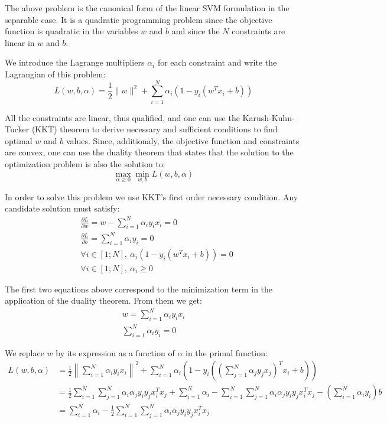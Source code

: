 \documentclass{article}
\begin{document}
The above problem is the canonical form of the linear SVM formulation in the separable case. It is a quadratic programming problem since the objective function is quadratic in the variables $w$ and $b$ and since the $N$ constraints are linear in $w$ and $b$.

We introduce the Lagrange multipliers $\alpha_i$ for each constraint and write the Lagrangian of this problem:
\begin{equation*}
L(w,b,\alpha) = \frac{1}{2} \|w\|^2 + \sum_{i=1}^N \alpha_i\left(1-y_i\left( w^Tx_i + b \right)\right)
\end{equation*}

All the constraints are linear, thus qualified, and one can use the Karush-Kuhn-Tucker (KKT) theorem to derive necessary and sufficient conditions to find optimal $w$ and $b$ values. Since, additionaly, the objective function and constraints are convex, one can use the duality theorem that states that the solution to the optimization problem is also the solution to:
\begin{equation*}
\max_{\alpha \geq 0} \min_{w,b} L(w,b,\alpha)
\end{equation*}

In order to solve this problem we use KKT's first order necessary condition. Any candidate solution must satisfy:
\begin{align*}
&\frac{\partial L}{\partial w} = w - \sum_{i=1}^N \alpha_i y_i x_i = 0\\
&\frac{\partial L}{\partial b} = \sum_{i=1}^N \alpha_i y_i = 0\\
&\forall i\in [1;N], \ \alpha_i\left(1-y_i\left( w^Tx_i + b \right)\right) = 0\\
&\forall i\in [1;N], \ \alpha_i \geq 0
\end{align*}

The first two equations above correspond to the minimization term in the application of the duality theorem. From them we get:
\begin{gather*}
w= \sum_{i=1}^N \alpha_i y_i x_i\\
\sum_{i=1}^N \alpha_i y_i = 0
\end{gather*}

We replace $w$ by its expression as a function of $\alpha$ in the primal function:
\begin{align*}
L(w,b,\alpha) &= \frac{1}{2} \left\|\sum_{i=1}^N \alpha_i y_i x_i\right\|^2 + \sum_{i=1}^N \alpha_i\left(1-y_i\left( \left(\sum_{j=1}^N \alpha_j y_j x_j\right)^Tx_i + b \right)\right)\\
&= \frac{1}{2} \sum_{i=1}^N \sum_{j=1}^N  \alpha_i \alpha_j y_i y_j x_i^T x_j + \sum_{i=1}^N \alpha_i - \sum_{i=1}^N \sum_{j=1}^N  \alpha_i \alpha_j y_i y_j x_i^T x_j - \left(\sum_{i=1}^N \alpha_i y_i\right) b\\
&= \sum_{i=1}^N \alpha_i - \frac{1}{2} \sum_{i=1}^N \sum_{j=1}^N  \alpha_i \alpha_j y_i y_j x_i^T x_j
\end{align*}
\end{document}
